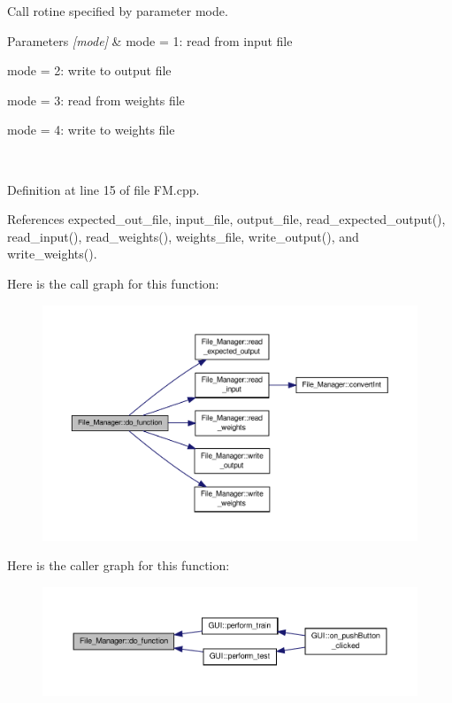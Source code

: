 Call rotine specified by parameter mode. 


\begin{DoxyParams}{Parameters}
{\em \mbox{[}mode\mbox{]}} & mode = 1\-: read from input file\par
 mode = 2\-: write to output file\par
 mode = 3\-: read from weights file\par
 mode = 4\-: write to weights file\par
 \\
\hline
\end{DoxyParams}


Definition at line 15 of file F\-M.\-cpp.



References expected\-\_\-out\-\_\-file, input\-\_\-file, output\-\_\-file, read\-\_\-expected\-\_\-output(), read\-\_\-input(), read\-\_\-weights(), weights\-\_\-file, write\-\_\-output(), and write\-\_\-weights().



Here is the call graph for this function\-:\nopagebreak
\begin{figure}[H]
\begin{center}
\leavevmode
\includegraphics[width=350pt]{d8/d84/a00001_abcb9cd1427a3b6ecfd41432391ec9bdc_cgraph}
\end{center}
\end{figure}




Here is the caller graph for this function\-:\nopagebreak
\begin{figure}[H]
\begin{center}
\leavevmode
\includegraphics[width=350pt]{d8/d84/a00001_abcb9cd1427a3b6ecfd41432391ec9bdc_icgraph}
\end{center}
\end{figure}


